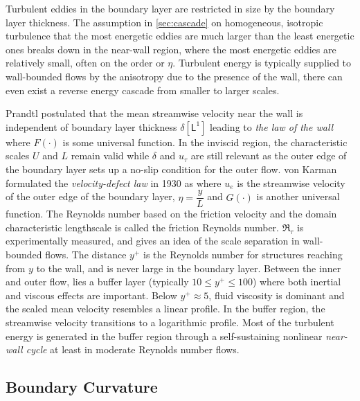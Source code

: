 Turbulent eddies in the boundary layer are restricted in size by the boundary layer thickness. The assumption in \autoref{sec:cascade} on homogeneous, isotropic turbulence that the most energetic eddies are much larger than the least energetic ones breaks down in the near-wall region, where the most energetic eddies are relatively small, often on the order or $\eta$. Turbulent energy is typically supplied to wall-bounded flows by the anisotropy due to the presence of the wall, there can even exist a reverse energy cascade from smaller to larger scales\cite{wall-bounded-turb}.

Prandtl postulated that the mean streamwise velocity near the wall is independent of boundary layer thickness $\delta \left[\textsf{L}^{1} \right]$ leading to \textit{the law of the wall}
where $F(\cdot)$ is some universal function. In the inviscid region, the characteristic scales $U$ and $L$ remain valid while $\delta$ and $u_\tau$ are still relevant as the outer edge of the boundary layer sets up a no-slip condition for the outer flow. von Karman formulated the \textit{velocity-defect law} in 1930 as 
where $u_e$ is the streamwise velocity of the outer edge of the boundary layer, $\eta=\dfrac{y}{L}$ and $G(\cdot)$ is another universal function. The Reynolds number based on the friction velocity and the domain characteristic lengthscale is called the friction Reynolds number. $\Re_\tau$ is experimentally measured, and gives an idea of the scale separation in wall-bounded flows.
The distance $y^+$ is the Reynolds number for structures reaching from $y$ to the wall, and is never large in the boundary layer\cite{wall-energy-cascade}. Between the inner and outer flow, lies a buffer layer (typically $10\leq y^+\leq 100$) where both inertial and viscous effects are important. Below $y^+\approx 5$, fluid viscosity is dominant and the scaled mean velocity resembles a linear profile. In the buffer region, the streamwise velocity transitions to a logarithmic profile. Most of the turbulent energy is generated in the buffer region through a self-sustaining nonlinear \textit{near-wall cycle} at least in moderate Reynolds number flows\cite{near-wall-cycle}.


\subsection{Boundary Curvature}

